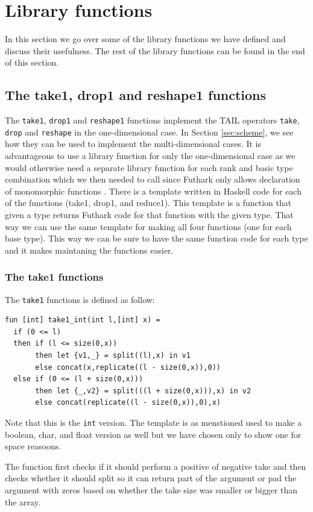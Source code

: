 \documentclass[11pt]{article}
\begin{document}
\section{Library functions}
In this section we go over some of the library functions we have defined and discuss their usefulness. The rest of the  library functions can be found in the end of this section. 

\subsection{The take1, drop1 and reshape1 functions}
The {\tt take1}, {\tt drop1} and {\tt reshape1} functions implement the TAIL operators {\tt take}, {\tt drop} and {\tt reshape} in the one-dimensional case. In Section \ref{sec:scheme}, we see how they can be used to implement the multi-dimensional cases. It is advantageous to use a library function for only the one-dimensional case as we would otherwise need a separate library function for each 
rank and basic type combination which we then needed to call since Futhark only allows declaration of monomorphic functions \cite{TroelsHenriksen}.
There is a template written in Haskell code for each of the functions (take1, drop1, and reduce1). This template is a function that given a type returns Futhark code for that function with the given type. That way we can use the same template for making all four functions (one for each base type). This way we can be sure to have the same function code for each type and it makes maintaning the functions easier. 

\subsubsection{The take1 functions}
The {\tt take1} functions is defined as follow: 
\begin{lstlisting}[language=Futhark]
fun [int] take1_int(int l,[int] x) =
  if (0 <= l)
  then if (l <= size(0,x))
       then let {v1,_} = split((l),x) in v1
       else concat(x,replicate((l - size(0,x)),0))
  else if (0 <= (l + size(0,x)))
       then let {_,v2} = split(((l + size(0,x))),x) in v2
       else concat(replicate((l - size(0,x)),0),x)
\end{lstlisting}
Note that this is the {\tt int} version. The template is as menstioned used to make a boolean, char, and float version as well but we have chosen only to show one for space reasoons. 

The function first checks if it should perform a positive of negative take and then checks whether it should split so it can return
part of the argument or pad the argument with zeros based on whether the take size was smaller or bigger than the array.
\end{document}
